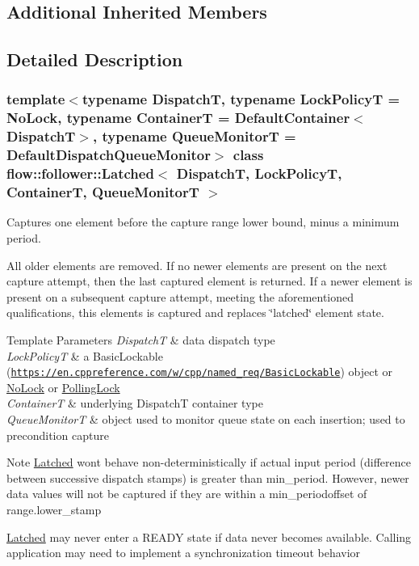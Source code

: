 \subsection*{Additional Inherited Members}


\subsection{Detailed Description}
\subsubsection*{template$<$typename DispatchT, typename Lock\+PolicyT = No\+Lock, typename ContainerT = Default\+Container$<$\+Dispatch\+T$>$, typename Queue\+MonitorT = Default\+Dispatch\+Queue\+Monitor$>$\newline
class flow\+::follower\+::\+Latched$<$ Dispatch\+T, Lock\+Policy\+T, Container\+T, Queue\+Monitor\+T $>$}

Captures one element before the capture range lower bound, minus a minimum period. 

All older elements are removed. If no newer elements are present on the next capture attempt, then the last captured element is returned. If a newer element is present on a subsequent capture attempt, meeting the aforementioned qualifications, this elements is captured and replaces \char`\"{}latched\char`\"{} element state.


\begin{DoxyTemplParams}{Template Parameters}
{\em DispatchT} & data dispatch type \\
\hline
{\em Lock\+PolicyT} & a Basic\+Lockable (\href{https://en.cppreference.com/w/cpp/named_req/BasicLockable}{\tt https\+://en.\+cppreference.\+com/w/cpp/named\+\_\+req/\+Basic\+Lockable}) object or \hyperlink{structflow_1_1_no_lock}{No\+Lock} or \hyperlink{structflow_1_1_polling_lock}{Polling\+Lock} \\
\hline
{\em ContainerT} & underlying {\ttfamily DispatchT} container type \\
\hline
{\em Queue\+MonitorT} & object used to monitor queue state on each insertion; used to precondition capture\\
\hline
\end{DoxyTemplParams}
\begin{DoxyNote}{Note}
\hyperlink{classflow_1_1follower_1_1_latched}{Latched} won\textquotesingle{}t behave non-\/deterministically if actual input period (difference between successive dispatch stamps) is greater than {\ttfamily min\+\_\+period}. However, newer data values will not be captured if they are within a {\ttfamily min\+\_\+period{\ttfamily  offset of {\ttfamily range.\+lower\+\_\+stamp}}}
\end{DoxyNote}
\hyperlink{classflow_1_1follower_1_1_latched}{Latched} may never enter a R\+E\+A\+DY state if data never becomes available. Calling application may need to implement a synchronization timeout behavior 

